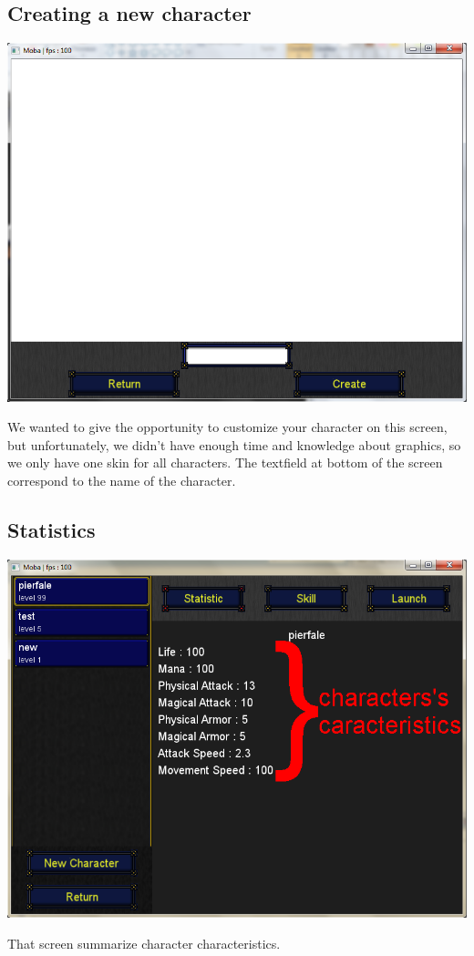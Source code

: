 \documentclass{scrreprt}
\begin{document}
		  \subsection{Creating a new character}
		  \begin{center}
		  \includegraphics[scale=0.4]{create_character.png}
		  \end{center}
		  We wanted to give the opportunity to customize your character on this screen, but unfortunately, we didn't have enough time and knowledge about graphics, so we only have one skin for all characters. The textfield at bottom of the screen correspond to the name of the character.
		  \subsection{Statistics}
		  \begin{center}
		  \includegraphics[scale=0.3]{stats_screen.png}
		  \end{center}
		  That screen summarize character characteristics.
\end{document}
